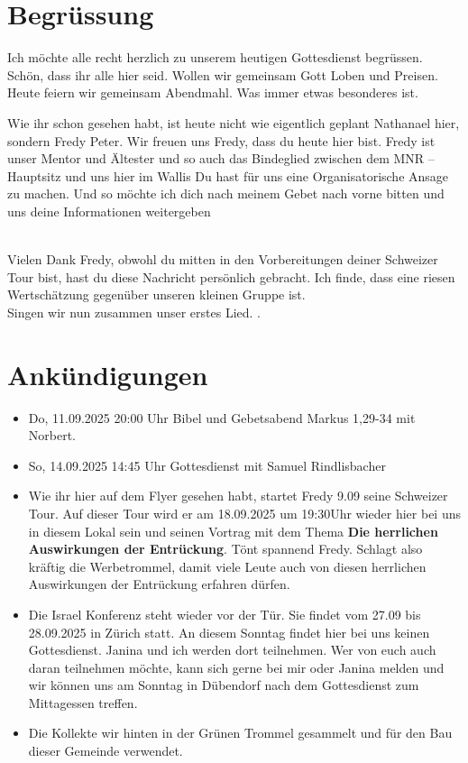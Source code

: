 \documentclass{../../inc/mybib}
\begin{document}
\section{Begrüssung}
Ich möchte alle recht herzlich zu unserem heutigen Gottesdienst begrüssen. Schön, dass ihr alle hier seid. Wollen wir gemeinsam Gott Loben und Preisen. Heute feiern wir gemeinsam Abendmahl. Was immer etwas besonderes ist. 
\begin{block}
Wie ihr schon gesehen habt, ist heute nicht wie eigentlich geplant Nathanael hier, sondern Fredy Peter. Wir freuen uns Fredy, dass du heute hier bist. Fredy ist unser Mentor und Ältester und so auch das Bindeglied zwischen dem MNR -- Hauptsitz und uns hier im Wallis Du hast für uns eine Organisatorische Ansage zu machen. Und so möchte ich dich nach meinem Gebet nach vorne bitten und uns deine Informationen weitergeben
\end{block}

\beten{}
\\

Vielen Dank Fredy, obwohl du mitten in den Vorbereitungen deiner Schweizer Tour bist, hast du diese Nachricht persönlich gebracht. Ich finde, dass eine riesen Wertschätzung gegenüber unseren kleinen Gruppe ist.\\

Singen wir nun zusammen unser erstes Lied.
{}.

\section{Ankündigungen}
\begin{itemize}
    \item {} Do, 11.09.2025 20:00 Uhr Bibel und Gebetsabend Markus 1,29-34 mit Norbert.
    \item {} So, 14.09.2025 14:45 Uhr Gottesdienst mit Samuel Rindlisbacher
    \item {} Wie ihr hier auf dem Flyer gesehen habt, startet Fredy 9.09 seine Schweizer Tour. Auf dieser Tour wird er am 18.09.2025 um 19:30Uhr wieder hier bei uns in diesem Lokal sein und seinen Vortrag mit dem Thema \textbf{Die herrlichen Auswirkungen der Entrückung}. Tönt spannend Fredy. Schlagt also kräftig die Werbetrommel, damit viele Leute auch von diesen herrlichen Auswirkungen der Entrückung erfahren dürfen.
    \item {} Die Israel Konferenz steht wieder vor der Tür. Sie findet vom 27.09 bis 28.09.2025 in Zürich statt. An diesem Sonntag findet hier bei uns keinen Gottesdienst. Janina und ich werden dort teilnehmen. Wer von euch auch daran teilnehmen möchte, kann sich gerne bei mir oder Janina melden und wir können uns am Sonntag in Dübendorf nach dem Gottesdienst zum Mittagessen treffen.
    \item Die Kollekte wir hinten in der Grünen Trommel gesammelt und für den Bau dieser Gemeinde verwendet.
\end{itemize}
\end{document}
